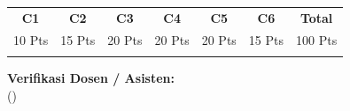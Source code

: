 \documentclass[10pt,a4paper]{article}
\begin{document}
\vspace{1.5mm}

\noindent\begin{minipage}[b]{0.65\textwidth}%
  \centering
  \scriptsize
  \begin{tabular}{|c|c|c|c|c|c|c|}
    \hline
    \rowcolor{unibblue}
    \textbf{\color{white}C1} & \textbf{\color{white}C2} & \textbf{\color{white}C3} & \textbf{\color{white}C4} & \textbf{\color{white}C5} & \textbf{\color{white}C6} & \textbf{\color{white}Total} \\
    \rowcolor{unibblue!10}
    10 Pts & 15 Pts & 20 Pts & 20 Pts & 20 Pts & 15 Pts & 100 Pts \\
    \hline
    & & & & & & \\[2.5mm]
    \hline
  \end{tabular}%
\end{minipage}%
\hfill%
\begin{minipage}[b]{0.32\textwidth}%
  \centering
  \scriptsize
  \textbf{Verifikasi Dosen / Asisten:}\\[5mm]
  (\dotfill)
\end{minipage}\par
\end{document}
